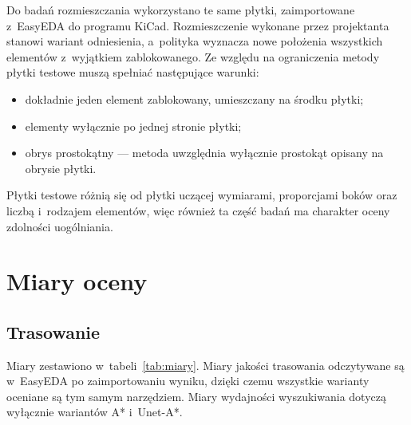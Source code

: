 Do badań rozmieszczania wykorzystano te same płytki, zaimportowane
z~EasyEDA do programu KiCad. Rozmieszczenie wykonane przez projektanta
stanowi wariant odniesienia, a~polityka wyznacza nowe położenia
wszystkich elementów z~wyjątkiem zablokowanego. Ze względu na
ograniczenia metody płytki testowe muszą spełniać następujące warunki:
\begin{itemize}
  \item dokładnie jeden element zablokowany, umieszczany na środku
    płytki;
  \item elementy wyłącznie po jednej stronie płytki;
  \item obrys prostokątny --- metoda uwzględnia wyłącznie prostokąt
    opisany na obrysie płytki.
\end{itemize}
Płytki testowe różnią się od płytki uczącej wymiarami, proporcjami boków
oraz liczbą i~rodzajem elementów, więc również ta część badań ma
charakter oceny zdolności uogólniania.

\section{Miary oceny}
\label{sec:miary}

\subsection{Trasowanie}
\label{sec:miary-trasowanie}

Miary zestawiono w~tabeli~\ref{tab:miary}. Miary jakości trasowania
odczytywane są w~EasyEDA po zaimportowaniu wyniku, dzięki czemu wszystkie
warianty oceniane są tym samym narzędziem. Miary wydajności wyszukiwania
dotyczą wyłącznie wariantów A* i~Unet-A*.

